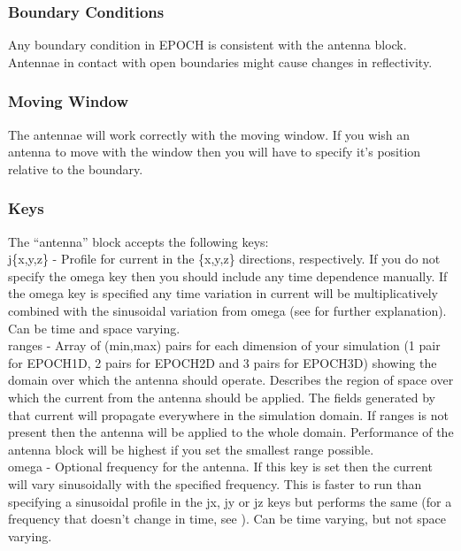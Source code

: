\subsubsection{Boundary Conditions}

Any boundary condition in EPOCH is consistent with the antenna block. Antennae
in contact with open boundaries might cause changes in reflectivity.

\subsubsection{Moving Window}

The antennae will work correctly with the moving window. If you wish an antenna
to move with the window then you will have to specify it's position relative to
the  boundary.

\subsubsection{Keys}

The ``antenna'' block accepts the following keys:\\

{\emphtext j\{x,y,z\}} -  Profile for current in the \{x,y,z\} directions,
  respectively. If you do not specify the omega key then you should include any
  time dependence manually. If the omega key is specified any time variation in
  current will be multiplicatively combined with the sinusoidal variation from
  omega (see  for further explanation). Can be time and
  space varying.\\

{\emphtext ranges} - Array of (min,max) pairs for each dimension of your
  simulation (1 pair for EPOCH1D, 2 pairs for EPOCH2D and 3 pairs for EPOCH3D)
  showing the domain over which the antenna should operate. Describes the region
  of space over which the current from the antenna should be applied. The fields
  generated by that current will propagate everywhere in the simulation domain.
  If ranges is not present then the antenna will be applied to the whole domain.
  Performance of the antenna block will be highest if you set the smallest range
  possible.\\

{\emphtext omega} -  Optional frequency for the antenna. If this key is set
  then the current will vary sinusoidally with the specified frequency. This is
  faster to run than specifying a sinusoidal profile in the jx, jy or jz keys
  but performs the same (for a frequency that doesn't change in time, see
  ). Can be time varying, but not space varying.\\

